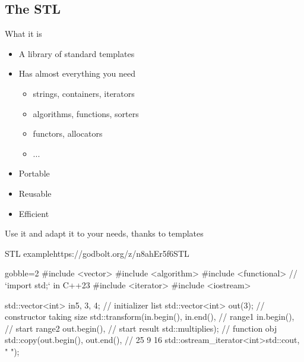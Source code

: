 \subsection[STL]{The STL}

\begin{frame}[fragile]
  \begin{block}{What it is}
    \begin{itemize}
    \item A library of standard templates
    \item Has almost everything you need
      \begin{itemize}
      \item strings, containers, iterators
      \item algorithms, functions, sorters
      \item functors, allocators
      \item ...
      \end{itemize}
    \item Portable
    \item Reusable
    \item Efficient
    \end{itemize}
  \end{block}
  \pause
  \begin{exampleblock}{Use it}
    and adapt it to your needs, thanks to templates
  \end{exampleblock}
\end{frame}

\begin{frame}[fragile]
  \begin{exampleblockGB}{STL example}{https://godbolt.org/z/n8ahEr5f6}{STL}
    \begin{cppcode*}{gobble=2}
      #include <vector>
      #include <algorithm>
      #include <functional>     // `import std;` in C++23
      #include <iterator>
      #include <iostream>

      std::vector<int> in{5, 3, 4};   // initializer list
      std::vector<int> out(3); // constructor taking size
      std::transform(in.begin(), in.end(),      // range1
                     in.begin(),          // start range2
                     out.begin(),         // start result
                     std::multiplies{});  // function obj
      std::copy(out.begin(), out.end(),   // 25 9 16
        std::ostream_iterator<int>{std::cout, " "});
    \end{cppcode*}
  \end{exampleblockGB}
\end{frame}

